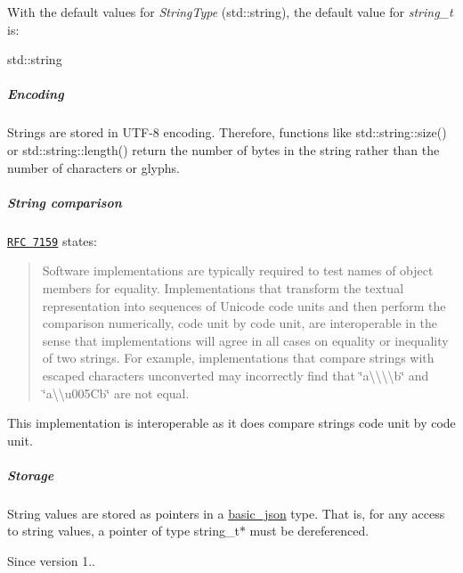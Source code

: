 With the default values for {\itshape String\+Type} ({\ttfamily std\+::string}), the default value for {\itshape string\+\_\+t} is\+:


\begin{DoxyCode}
std::string
\end{DoxyCode}


\subparagraph*{Encoding}

Strings are stored in U\+T\+F-\/8 encoding. Therefore, functions like {\ttfamily std\+::string\+::size()} or {\ttfamily std\+::string\+::length()} return the number of bytes in the string rather than the number of characters or glyphs.

\subparagraph*{String comparison}

\href{http://rfc7159.net/rfc7159}{\tt R\+FC 7159} states\+: \begin{quote}
Software implementations are typically required to test names of object members for equality. Implementations that transform the textual representation into sequences of Unicode code units and then perform the comparison numerically, code unit by code unit, are interoperable in the sense that implementations will agree in all cases on equality or inequality of two strings. For example, implementations that compare strings with escaped characters unconverted may incorrectly find that {\ttfamily \char`\"{}a\textbackslash{}\textbackslash{}\textbackslash{}\textbackslash{}b\char`\"{}} and {\ttfamily \char`\"{}a\textbackslash{}\textbackslash{}u005\+Cb\char`\"{}} are not equal. \end{quote}


This implementation is interoperable as it does compare strings code unit by code unit.

\subparagraph*{Storage}

String values are stored as pointers in a \hyperlink{classnlohmann_1_1basic__json}{basic\+\_\+json} type. That is, for any access to string values, a pointer of type {\ttfamily string\+\_\+t$\ast$} must be dereferenced.

\begin{DoxySince}{Since}
version 1.. 
\end{DoxySince}
